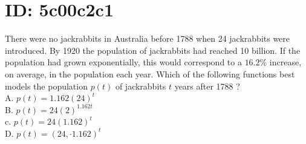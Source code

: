 \section*{ID: 5c00c2c1}
There were no jackrabbits in Australia before 1788 when 24 jackrabbits were introduced. By 1920 the population of jackrabbits had reached 10 billion. If the population had grown exponentially, this would correspond to a $16.2 \%$ increase, on average, in the population each year. Which of the following functions best models the population $p(t)$ of jackrabbits $t$ years after 1788 ?\\
A. $p(t)=1.162(24)^{t}$\\
B. $p(t)=24(2)^{1.162 t}$\\
c. $p(t)=24(1.162)^{t}$\\
D. $p(t)=(24, \cdot 1.162)^{t}$


